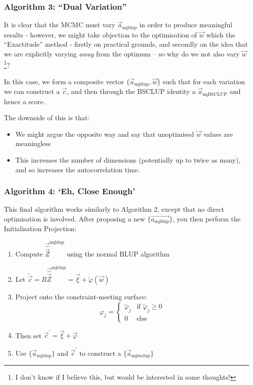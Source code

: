 \documentclass[]{article}
\begin{document}
			\subsubsection*{Algorithm 3: ``Dual Variation''}

				It is clear that the MCMC must vary $\vec{a}_\text{nqblup}$ in order to produce meaningful results - however, we might take objection to the optimisation of $\vec{w}$ which the ``Exactitude'' method - firstly on practical grounds, and secondly on the idea that we are explicitly varying \textit{away} from the optimum -- so why do we not also vary $\vec{w}$\footnote{I don't know if I believe this, but would be interested in some thoughts!}?

				In this case, we form a composite vector $\{\vec{a}_\text{nqblup}, \vec{w}\}$ such that for each variation we can construct a $\vec{c}$, and then through the BSCLUP identity a $\vec{a}_\text{nqBSCLUP}$ and hence a score.

				The downside of this is that:
				\begin{itemize}
					\item We might argue the opposite way and say that unoptimised $\vec{w}$ values are meaningless
					\item This increases the number of dimensions (potentially up to twice as many), and so increases the autocorrelation time.
				\end{itemize}

			\subsubsection*{Algorithm 4: `Eh, Close Enough'}

				This final algorithm works similarly to Algorithm 2, except that no direct optimisation is involved. After proposing a new $\{\vec{a_\text{nqblup}}\}$, you then perform the Initialisation Projection:

				\begin{enumerate}
					\item Compute $\vec{\hat{\vec{Z}}}^\text{nqblup}$ using the normal BLUP algorithm
					\item Let $\tilde{\vec{c}} = B \vec{\hat{\vec{Z}}}^\text{nqblup} = \vec{\xi} + \tilde{{\varphi}}(\vec{w})$
					\item Project onto the constraint-meeting surface:
					$$ \varphi_j = \begin{cases} \tilde{\varphi}_j & \text{if } \tilde{\varphi}_j \geq 0
						\\
						0 & \text{else} \end{cases}$$
					\item Then set $\vec{c}^\prime = \vec{\xi} + \vec{\varphi}$
					\item Use $\{\vec{a}_\text{nqblup}\}$ and $\vec{c}^\prime$ to construct a $\{\vec{a}_\text{nqbsclup}\}$
				\end{enumerate}
\end{document}
